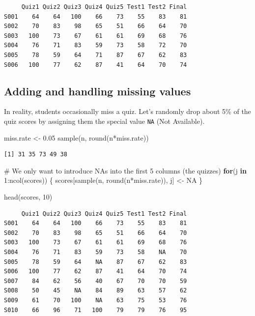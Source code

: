 \documentclass[
  letterpaper,
  DIV=11,
  numbers=noendperiod]{scrreprt}
\newenvironment{Shaded}{\begin{snugshade}}{\end{snugshade}}
\newcommand{\CommentTok}[1]{\textcolor[rgb]{0.37,0.37,0.37}{#1}}
\newcommand{\ConstantTok}[1]{\textcolor[rgb]{0.56,0.35,0.01}{#1}}
\newcommand{\ControlFlowTok}[1]{\textcolor[rgb]{0.00,0.23,0.31}{\textbf{#1}}}
\newcommand{\DecValTok}[1]{\textcolor[rgb]{0.68,0.00,0.00}{#1}}
\newcommand{\FloatTok}[1]{\textcolor[rgb]{0.68,0.00,0.00}{#1}}
\newcommand{\FunctionTok}[1]{\textcolor[rgb]{0.28,0.35,0.67}{#1}}
\newcommand{\NormalTok}[1]{\textcolor[rgb]{0.00,0.23,0.31}{#1}}
\newcommand{\OtherTok}[1]{\textcolor[rgb]{0.00,0.23,0.31}{#1}}
\newcommand{\SpecialCharTok}[1]{\textcolor[rgb]{0.37,0.37,0.37}{#1}}
\begin{document}
\begin{verbatim}
     Quiz1 Quiz2 Quiz3 Quiz4 Quiz5 Test1 Test2 Final
S001    64    64   100    66    73    55    83    81
S002    70    83    98    65    51    66    64    70
S003   100    73    67    61    61    69    68    76
S004    76    71    83    59    73    58    72    70
S005    78    59    64    71    87    67    62    83
S006   100    77    62    87    41    64    70    74
\end{verbatim}

\subsection{Adding and handling missing
values}\label{adding-and-handling-missing-values}

In reality, students occasionally miss a quiz. Let's randomly drop about
5\% of the quiz scores by assigning them the special value \texttt{NA}
(Not Available).

\begin{Shaded}
\begin{Highlighting}[]
\NormalTok{miss.rate }\OtherTok{\textless{}{-}} \FloatTok{0.05}
\FunctionTok{sample}\NormalTok{(n, }\FunctionTok{round}\NormalTok{(n}\SpecialCharTok{*}\NormalTok{miss.rate))}
\end{Highlighting}
\end{Shaded}

\begin{verbatim}
[1] 31 35 73 49 38
\end{verbatim}

\begin{Shaded}
\begin{Highlighting}[]
\CommentTok{\# We only want to introduce NAs into the first 5 columns (the quizzes)}
\ControlFlowTok{for}\NormalTok{(j }\ControlFlowTok{in} \DecValTok{1}\SpecialCharTok{:}\FunctionTok{ncol}\NormalTok{(scores)) \{}
\NormalTok{    scores[}\FunctionTok{sample}\NormalTok{(n, }\FunctionTok{round}\NormalTok{(n}\SpecialCharTok{*}\NormalTok{miss.rate)), j] }\OtherTok{\textless{}{-}} \ConstantTok{NA}
\NormalTok{\}}

\FunctionTok{head}\NormalTok{(scores, }\DecValTok{10}\NormalTok{)}
\end{Highlighting}
\end{Shaded}

\begin{verbatim}
     Quiz1 Quiz2 Quiz3 Quiz4 Quiz5 Test1 Test2 Final
S001    64    64   100    66    73    55    83    81
S002    70    83    98    65    51    66    64    70
S003   100    73    67    61    61    69    68    76
S004    76    71    83    59    73    58    NA    70
S005    78    59    64    NA    87    67    62    83
S006   100    77    62    87    41    64    70    74
S007    84    62    56    40    67    70    70    59
S008    50    45    NA    84    89    63    57    62
S009    61    70   100    NA    63    75    53    76
S010    66    96    71   100    79    79    76    95
\end{verbatim}
\end{document}
